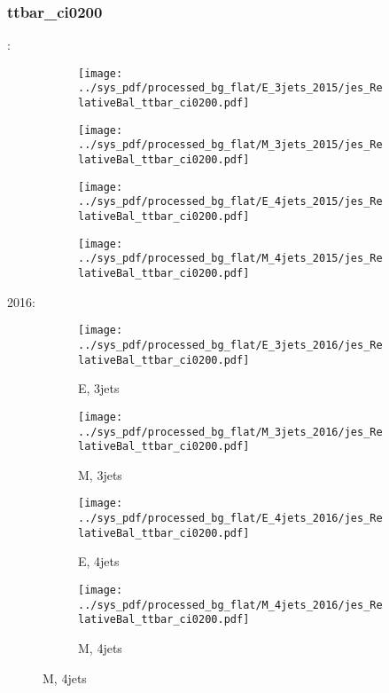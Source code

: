 \documentclass{beamer}
\begin{document}
\begin{frame}
\frametitle{ttbar_ci0200}
\fontsize{5}{1}:
\begin{figure}
\centering
\begin{subfigure}[b]{0.24\textwidth}
\texttt{[image: ../sys\_pdf/processed\_bg\_flat/E\_3jets\_2015/jes\_RelativeBal\_ttbar\_ci0200.pdf]}
\end{subfigure}
\begin{subfigure}[b]{0.24\textwidth}
\texttt{[image: ../sys\_pdf/processed\_bg\_flat/M\_3jets\_2015/jes\_RelativeBal\_ttbar\_ci0200.pdf]}
\end{subfigure}
\begin{subfigure}[b]{0.24\textwidth}
\texttt{[image: ../sys\_pdf/processed\_bg\_flat/E\_4jets\_2015/jes\_RelativeBal\_ttbar\_ci0200.pdf]}
\end{subfigure}
\begin{subfigure}[b]{0.24\textwidth}
\texttt{[image: ../sys\_pdf/processed\_bg\_flat/M\_4jets\_2015/jes\_RelativeBal\_ttbar\_ci0200.pdf]}
\end{subfigure}
\end{figure}
2016:
\begin{figure}
\centering
\begin{subfigure}[b]{0.24\textwidth}
\texttt{[image: ../sys\_pdf/processed\_bg\_flat/E\_3jets\_2016/jes\_RelativeBal\_ttbar\_ci0200.pdf]}
\captionsetup{font=tiny}
\caption{E, 3jets}
\end{subfigure}
\begin{subfigure}[b]{0.24\textwidth}
\texttt{[image: ../sys\_pdf/processed\_bg\_flat/M\_3jets\_2016/jes\_RelativeBal\_ttbar\_ci0200.pdf]}
\captionsetup{font=tiny}
\caption{M, 3jets}
\end{subfigure}
\begin{subfigure}[b]{0.24\textwidth}
\texttt{[image: ../sys\_pdf/processed\_bg\_flat/E\_4jets\_2016/jes\_RelativeBal\_ttbar\_ci0200.pdf]}
\captionsetup{font=tiny}
\caption{E, 4jets}
\end{subfigure}
\begin{subfigure}[b]{0.24\textwidth}
\texttt{[image: ../sys\_pdf/processed\_bg\_flat/M\_4jets\_2016/jes\_RelativeBal\_ttbar\_ci0200.pdf]}
\captionsetup{font=tiny}
\caption{M, 4jets}
\end{subfigure}
\end{figure}
\end{frame}
\end{document}
